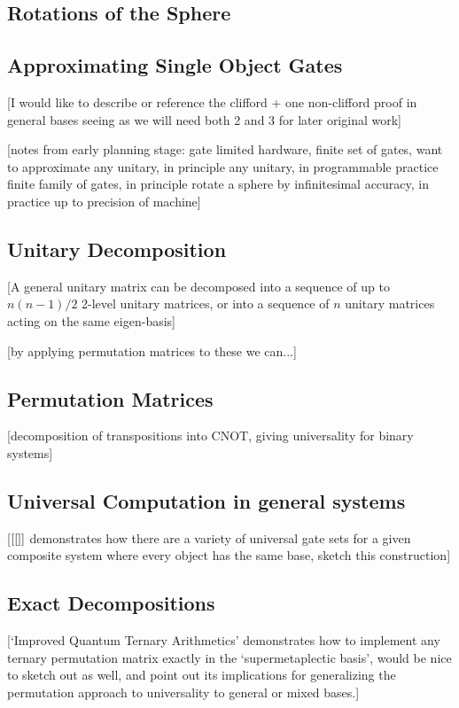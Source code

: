 \documentclass[]{article}
\begin{document}
\subsection{Rotations of the Sphere}

\subsection{Approximating Single Object Gates}
[I would like to describe or reference the clifford + one non-clifford proof in general bases seeing as we will need both 2 and 3 for later original work]

[notes from early planning stage: gate limited hardware, finite set of gates, want to approximate any unitary, in principle any unitary, in programmable practice finite family of gates, in principle rotate a sphere by infinitesimal accuracy, in practice up to precision of machine]

\subsection{Unitary Decomposition}
[A general unitary matrix can be decomposed into a sequence of up to $n(n-1)/2$ 2-level unitary matrices, or into a sequence of $n$ unitary matrices acting on the same eigen-basis]

[by applying permutation matrices to these we can...]
\subsection{Permutation Matrices}
[decomposition of transpositions into CNOT, giving universality for binary systems]
\subsection{Universal Computation in general systems}
[$[\cite]$ demonstrates how there are a variety of universal gate sets for a given composite system where every object has the same base, sketch this construction]
\subsection{Exact Decompositions}
[`Improved Quantum Ternary Arithmetics' demonstrates how to implement any ternary permutation matrix exactly in the `supermetaplectic basis', would be nice to sketch out as well, and point out its implications for generalizing the permutation approach to universality to general or mixed bases.]
\end{document}
